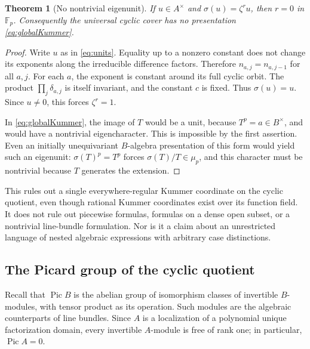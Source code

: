 \documentclass[11pt,a4paper]{article}
\newtheorem{theorem}{Theorem}[section]
\theoremstyle{definition}
\theoremstyle{remark}
\newcommand{\F}{\mathbb F}
\newcommand{\Pic}{\operatorname{Pic}}
\begin{document}
\begin{theorem}[No nontrivial eigenunit]\label{thm:eigenunit}
If $u\in A^\times$ and $\sigma(u)=\zeta^r u$, then $r=0$ in $\F_p$.
Consequently the universal cyclic cover has no presentation
\eqref{eq:globalKummer}.
\end{theorem}
\begin{proof}
Write $u$ as in \eqref{eq:units}. Equality up to a nonzero constant does
not change its exponents along the irreducible difference factors.
Therefore $n_{a,j}=n_{a,j-1}$ for all $a,j$. For each $a$, the exponent is
constant around its full cyclic orbit. The product
$\prod_j\delta_{a,j}$ is itself invariant, and the constant $c$ is fixed.
Thus $\sigma(u)=u$. Since $u\neq0$, this forces $\zeta^r=1$.

In \eqref{eq:globalKummer}, the image of $T$ would be a unit, because
$T^p=a\in B^\times$, and would have a nontrivial eigencharacter. This is
impossible by the first assertion. Even an initially unequivariant
$B$-algebra presentation of this form would yield such an eigenunit:
$\sigma(T)^p=T^p$ forces $\sigma(T)/T\in\mu_p$, and this character
must be nontrivial because $T$ generates the extension.
\end{proof}

This rules out a single everywhere-regular Kummer coordinate on the
cyclic quotient, even though rational Kummer coordinates exist over its
function field. It does not rule out piecewise formulas, formulas on a
dense open subset, or a nontrivial line-bundle formulation. Nor is it a
claim about an unrestricted language of nested algebraic expressions with
arbitrary case distinctions.

\subsection{The Picard group of the cyclic quotient}

Recall that $\Pic B$ is the abelian group of isomorphism classes of
invertible $B$-modules, with tensor product as its operation. Such modules
are the algebraic counterparts of line bundles. Since $A$ is a localization
of a polynomial unique factorization domain, every invertible $A$-module
is free of rank one; in particular, $\Pic A=0$.
\end{document}
